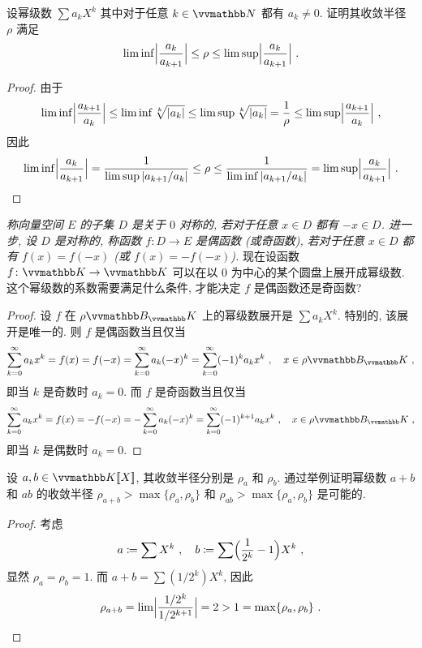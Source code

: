 \begin{exercise}
    设幂级数 \(\sum a_k X^k\) 其中对于任意 \(k \in \N\) 都有 \(a_k \neq 0\). 证明其收敛半径 \(\rho\) 满足
    \[
        \liminf \Bigl|\frac{a_k}{a_{k + 1}}\Bigr| \leq \rho \leq \limsup \Bigl|\frac{a_k}{a_{k + 1}}\Bigr|\ .
    \]
\end{exercise}

\begin{proof}
    由于
    \[
        \liminf \Bigl|\frac{a_{k + 1}}{a_k}\Bigr| \leq \liminf \sqrt[k]{|a_k|} \leq \limsup \sqrt[k]{|a_k|} = \frac{1}{\rho} \leq \limsup \Bigl|\frac{a_{k + 1}}{a_k}\Bigr|\ ,
    \]
    因此
    \[
        \liminf \Bigl|\frac{a_k}{a_{k + 1}}\Bigr| = \frac{1}{\limsup |a_{k + 1} / a_k|} \leq \rho \leq \frac{1}{\liminf |a_{k + 1} / a_k|} = \limsup \Bigl|\frac{a_k}{a_{k + 1}}\Bigr|\ .
    \]
\end{proof}

\begin{exercise}
    \textsl{称向量空间 \(E\) 的子集 \(D\) 是关于 \(0\) 对称的, 若对于任意 \(x \in D\) 都有 \(- x \in D\). 进一步, 设 \(D\) 是对称的, 称函数 \(f \colon D \to E\) 是偶函数 (或奇函数), 若对于任意 \(x \in D\) 都有 \(f(x) = f(- x)\) (或 \(f(x) = - f(- x)\)).} 现在设函数 \(f \colon \K \to \K\) 可以在以 \(0\) 为中心的某个圆盘上展开成幂级数. 这个幂级数的系数需要满足什么条件, 才能决定 \(f\) 是偶函数还是奇函数?
\end{exercise}

\begin{proof}
    设 \(f\) 在 \(\rho \B_\K\) 上的幂级数展开是 \(\sum a_k X^k\). 特别的, 该展开是唯一的. 则 \(f\) 是偶函数当且仅当
    \[
        \sum_{k = 0}^\infty a_k x^k = f(x) = f(- x) = \sum_{k = 0}^\infty a_k (- x)^k = \sum_{k = 0}^\infty (- 1)^k a_k x^k\ ,\quad x \in \rho \B_\K\ ,
    \]
    即当 \(k\) 是奇数时 \(a_k = 0\). 而 \(f\) 是奇函数当且仅当
    \[
        \sum_{k = 0}^\infty a_k x^k = f(x) = - f(- x) = - \sum_{k = 0}^\infty a_k (- x)^k = \sum_{k = 0}^\infty (- 1)^{k + 1} a_k x^k\ ,\quad x \in \rho \B_\K\ ,
    \]
    即当 \(k\) 是偶数时 \(a_k = 0\).
\end{proof}

\begin{exercise}
    设 \(a, b \in \K[\![X]\!]\), 其收敛半径分别是 \(\rho_a\) 和 \(\rho_b\). 通过举例证明幂级数 \(a + b\) 和 \(a b\) 的收敛半径 \(\rho_{a + b} > \max\{\rho_a, \rho_b\}\) 和 \(\rho_{a b} > \max\{\rho_a, \rho_b\}\) 是可能的.
\end{exercise}

\begin{proof}
    考虑
    \[
        a \coloneqq \sum X^k\ ,\quad b \coloneqq \sum \Bigl(\frac{1}{2^k} - 1\Bigr) X^k\ ,
    \]
    显然 \(\rho_a = \rho_b = 1\). 而 \(a + b = \sum (1 / 2^k) X^k\), 因此
    \[
        \rho_{a + b} = \lim \Bigl| \frac{1 / 2^k}{1 / 2^{k + 1}} \Bigr| = 2 > 1 = \max\{\rho_a, \rho_b\}\ .
    \]
\end{proof}

